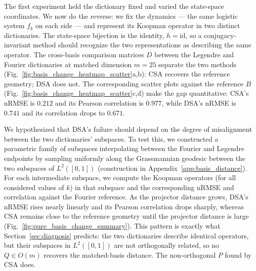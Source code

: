 \documentclass{article}
\theoremstyle{definition}
\begin{document}
The first experiment held the dictionary fixed and varied the state-space coordinates. We now do the reverse: we fix the dynamics --- the same logistic system $f_k$ on each side --- and represent its Koopman operator in two distinct dictionaries. The state-space bijection is the identity, $h=\mathrm{id}$, so a conjugacy-invariant method should recognize the two representations as describing the same operator. The cross-basis comparison matrices $D$ between the Legendre and Fourier dictionaries at matched dimension $m=25$ separate the two methods (Fig.~\ref{fig:basis_change_heatmap_scatter}a,b): CSA recovers the reference geometry; DSA does not. The corresponding scatter plots against the reference $B$ (Fig.~\ref{fig:basis_change_heatmap_scatter}c,d) make the gap quantitative: CSA's nRMSE is $0.212$ and its Pearson correlation is $0.977$, while DSA's nRMSE is $0.741$ and its correlation drops to $0.671$. 

We hypothesized that DSA's failure should depend on the degree of misalignment between the two dictionaries' subspaces. To test this, we constructed a parametric family of subspaces interpolating between the Fourier and Legendre endpoints by sampling uniformly along the Grassmannian geodesic between the two subspaces of $L^2([0,1])$ (construction in Appendix~\ref{app:basis_distance}). For each intermediate subspace, we compute the Koopman operators (for all considered values of $k$) in that subspace and the corresponding nRMSE and correlation against the Fourier reference. As the projector distance grows, DSA's nRMSE rises nearly linearly and its Pearson correlation drops sharply, whereas CSA remains close to the reference geometry until the projector distance is large (Fig.~\ref{fig:pure_basis_change_summary}). This pattern is exactly what Section~\ref{sec:diagnosis} predicts: the two dictionaries describe identical operators, but their subspaces in $L^2([0,1])$ are not orthogonally related, so no $Q\in O(m)$ recovers the matched-basis distance. The non-orthogonal $P$ found by CSA does.
\end{document}
